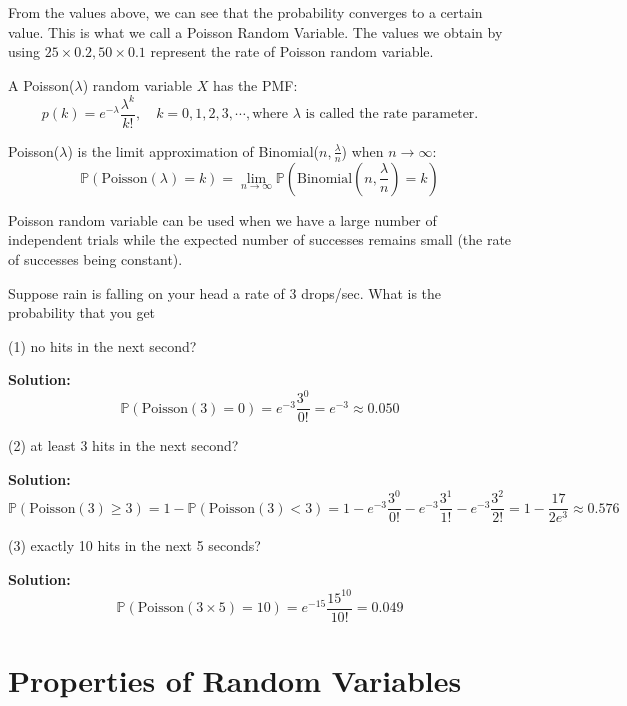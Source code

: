 From the values above, we can see that the probability converges to a certain value. This is what we call a Poisson Random Variable. The values we obtain by using \(25 \times 0.2, 50 \times 0.1\) represent the rate of Poisson random variable.

\begin{definition}
  A Poisson(\(\lambda\)) random variable \(X\) has the PMF:
  \[
    p(k) = e^{-\lambda}\dfrac{\lambda^k}{k!}, \quad k = 0, 1, 2, 3, \cdots, \text{where \(\lambda\) is called the rate parameter.}
  \]
\end{definition}

\begin{theorem}
  Poisson(\(\lambda\)) is the limit approximation of Binomial(\(n, \frac{\lambda}{n}\)) when \(n \to \infty\): 
  \[
    \mathbb{P}(\text{Poisson}(\lambda) = k) = \lim_{n \to \infty} \mathbb{P}(\text{Binomial}(n, \dfrac{\lambda}{n}) = k)
  \]
\end{theorem}

Poisson random variable can be used when we have a large number of independent trials while the expected number of successes remains small (the rate of successes being constant). 

\begin{eg}
  Suppose rain is falling on your head a rate of 3 drops/sec. What is the probability that you get 
  
  (1) no hits in the next second? 
  
  \textbf{Solution:} 
  \[
    \mathbb{P}(\text{Poisson}(3) = 0) = e^{-3}\dfrac{3^0}{0!} = e^{-3} \approx 0.050
  \]

  (2) at least 3 hits in the next second? 

  \textbf{Solution:} 
  \[
    \mathbb{P}(\text{Poisson}(3) \geq 3) = 1 - \mathbb{P}(\text{Poisson}(3) < 3) = 1 - e^{-3}\dfrac{3^0}{0!} - e^{-3}\dfrac{3^1}{1!} - e^{-3}\dfrac{3^2}{2!} = 1 - \dfrac{17}{2 e^{3}} \approx 0.576
  \]

  (3) exactly 10 hits in the next 5 seconds?

  \textbf{Solution:} 
  \[
    \mathbb{P}(\text{Poisson}(3 \times 5) = 10) = e^{-15}\dfrac{15^{10} }{10!} = 0.049
  \]
\end{eg}

\section{Properties of Random Variables}

